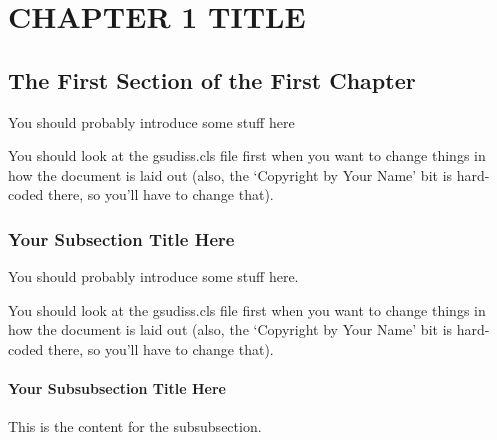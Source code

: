 \chapter{CHAPTER 1 TITLE}

\section{The First Section of the First Chapter}
	You should probably introduce some stuff here
    
    You should look at the gsudiss.cls file first when you want to change things in how the document is laid out (also, the `Copyright by Your Name' bit is hard-coded there, so you'll have to change that).

\subsection{Your Subsection Title Here}
You should probably introduce some stuff here.

You should look at the gsudiss.cls file first when you want to change things in how the document is laid out (also, the `Copyright by Your Name' bit is hard-coded there, so you'll have to change that).

\subsubsection{Your Subsubsection Title Here}
This is the content for the subsubsection.
